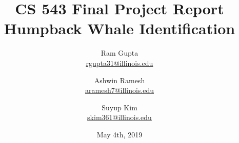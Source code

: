 \documentclass[12pt,letterpaper]{article}
\title{CS 543 Final Project Report\\
Humpback Whale Identification}
\author{
    Ram Gupta\\     
    \href{mailto:rgupta31@illinois.edu}{rgupta31@illinois.edu} 
    \and Ashwin Ramesh\\     
    \href{mailto:aramesh7@illinois.edu}{aramesh7@illinois.edu} 
    \and Suyup Kim\\
    \href{mailto:skim361@illinois.edu}{skim361@illinois.edu} 
   }
\date{May 4th, 2019}
\begin{document}
\maketitle

\begin{abstract}

\end{abstract}

%
%
%
%
%
%
%
%
%
%
%
%

%
%
%
\end{document}
